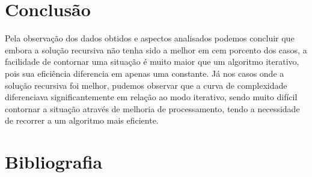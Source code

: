 \documentclass[a4paper, 12pt]{article}
\begin{document}
\newpage

\section{Conclusão}

Pela observação dos dados obtidos e aspectos analisados podemos concluir que embora a solução recursiva não tenha sido a melhor em cem porcento dos casos, a facilidade de contornar uma situação é muito maior que um algoritmo iterativo, pois sua eficiência diferencia em apenas uma constante. Já nos casos onde a solução recursiva foi melhor, pudemos observar que a curva de complexidade diferenciava significantemente em relação ao modo iterativo, sendo muito difícil contornar a situação através de melhoria de processamento, tendo a necessidade de recorrer a um algoritmo mais eficiente.

\newpage

\section*{Bibliografia}
\footnotesize{

\\ \\
\\ \\
\\ \\

}
\end{document}
